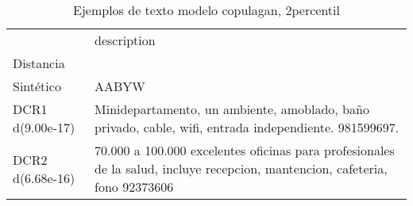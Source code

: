 \begin{table}[H]
\centering
\fontsize{10}{14}\selectfont
\caption{Ejemplos de texto modelo copulagan, 2percentil}
\label{table-example-economicos-b-2-copulagan-2p-text}
\begin{tabular}{|l|m{35em}|}
\hline
\rowcolor[gray]{0.8}
 & description \\
Distancia &  \\
\hline Sintético & AABYW \\
\hline DCR1 d(9.00e-17) & Minidepartamento, un ambiente, amoblado, ba\~no privado, cable, wifi, entrada independiente. 981599697. \\
\hline DCR2 d(6.68e-16) & 70.000 a 100.000 excelentes oficinas para profesionales de la salud, incluye recepcion, mantencion, cafeteria, fono 92373606 \\
\hline
\end{tabular}
\end{table}
